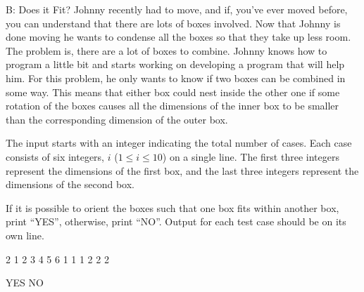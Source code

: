 \begin{problem}{B: Does it Fit?}
Johnny recently had to move, and if, you've ever moved before, you can understand that there are lots of boxes involved. 
Now that Johnny is done moving he wants to condense all the boxes so that they take up less room. 
The problem is, there are a lot of boxes to combine. 
Johnny knows how to program a little bit and starts working on developing a program that will help him. For this problem, he only wants to know if two boxes can be combined in some way. 
This means that either box could nest inside the other one if some rotation of the boxes causes all the dimensions of the inner box to be smaller than the corresponding dimension of the outer box.
\end{problem}

\begin{formalin}
The input starts with an integer indicating the total number of cases. 
Each case consists of six integers, $i$ ($1 \leq i \leq 10$) on a single line. 
The first three integers represent the dimensions of the first box, and the last three integers represent the dimensions of the second box.
\end{formalin}

\begin{formalout}
If it is possible to orient the boxes such that one box fits within another box, print ``YES'', otherwise, print ``NO''. 
Output for each test case should be on its own line.
\end{formalout}

\begin{datain}
2
1 2 3 4 5 6
1 1 1 2 2 2
\end{datain}

\begin{dataout}
YES
NO
\end{dataout}

